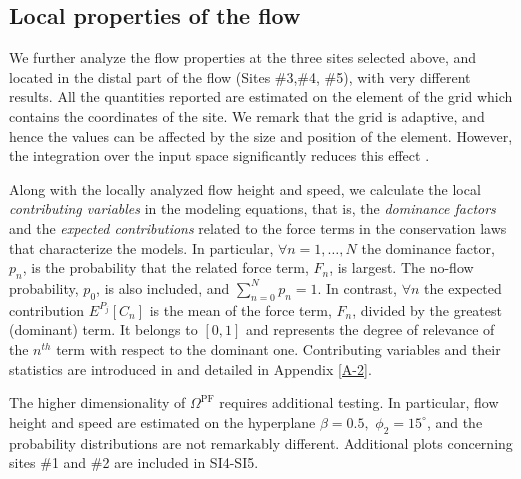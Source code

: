 \documentclass[nhess, manuscript]{copernicus}
\begin{document}
\subsection{Local properties of the flow}
We further analyze the flow properties at the three sites selected above, and located in the distal part of the flow (Sites \#3,\#4, \#5), with very different results. All the quantities reported are estimated on the element of the grid which contains the coordinates of the site. We remark that the grid is adaptive, and hence the values can be affected by the size and position of the element. However, the integration over the input space significantly reduces this effect \citep{Patra2018}.

Along with the locally analyzed flow height and speed, we calculate the local \emph{contributing variables} in the modeling equations, that is, the \emph{dominance factors} and the \emph{expected contributions} related to the force terms in the conservation laws that characterize the models. In particular, $\forall n=1,\dots,N$ the dominance factor, $p_n$, is the probability that the related force term, $F_n$, is largest. The no-flow probability, $p_0$, is also included, and $\sum_{n=0}^N p_n = 1$. In contrast, $\forall n$ the expected contribution $E^{P_j}\left[C_n\right]$ is the mean of the force term, $F_n$, divided by the greatest (dominant) term. It belongs to $[0,1]$ and represents the degree of relevance of the $n^{th}$ term with respect to the dominant one. Contributing variables and their statistics are introduced in \cite{Patra2018} and detailed in Appendix \ref{A-2}.

The higher dimensionality of $\Omega^{\textrm{PF}}$ requires additional testing. In particular, flow height and speed are  estimated on the hyperplane $\beta=0.5,$ $\phi_2=15^\circ$, and the probability distributions are not remarkably different. Additional plots concerning sites \#1 and \#2 are included in SI4-SI5.
\end{document}
